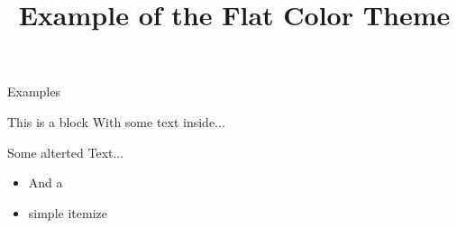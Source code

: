 \documentclass[12pt,a4paper]{beamer}
\title{Example of the Flat Color Theme}
\begin{document}
	\begin{frame}{}
		\maketitle
	\end{frame}
	\begin{frame}{Examples}
		\begin{block}{This is a block}
			With some text inside...
		\end{block}
		\alert{Some alterted Text...}
		\begin{itemize}
			\item And a
			\item simple itemize
		\end{itemize}
	\end{frame}
\end{document}
